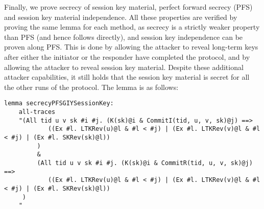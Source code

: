 Finally, we prove secrecy of session key material, perfect forward secrecy
(PFS) and session key material independence.
%
All these properties are verified by proving the same lemma for each method,
as secrecy is a strictly weaker property than PFS (and hence follows
directly), and session key independence can be proven along PFS.
%
This is done by allowing the attacker to reveal long-term keys after either
the initiator or the responder have completed the protocol, and by
allowing the attacker to reveal session key material.
%
Despite these additional attacker capabilities, it still holds that the session
key material is secret for all the other runs of the protocol.
%
The lemma is as follows:
\begin{lstlisting}
lemma secrecyPFSGIYSessionKey:
	all-traces
    "(All tid u v sk #i #j. (K(sk)@i & CommitI(tid, u, v, sk)@j) ==>
            ((Ex #l. LTKRev(u)@l & #l < #j) | (Ex #l. LTKRev(v)@l & #l < #j) | (Ex #l. SKRev(sk)@l))
         )
         &
         (All tid u v sk #i #j. (K(sk)@i & CommitR(tid, u, v, sk)@j) ==>
            ((Ex #l. LTKRev(u)@l & #l < #j) | (Ex #l. LTKRev(v)@l & #l < #j) | (Ex #l. SKRev(sk)@l))
     )
    "
\end{lstlisting}

